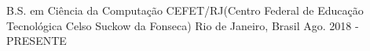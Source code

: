 

\begin{cventries}

  \cventry
    {B.S. em Ciência da Computação} %
    {CEFET/RJ(Centro Federal de Educação Tecnológica Celso Suckow da Fonseca)} %
    {Rio de Janeiro, Brasil} %
    {Ago. 2018 - PRESENTE} %
    {}
\end{cventries}
